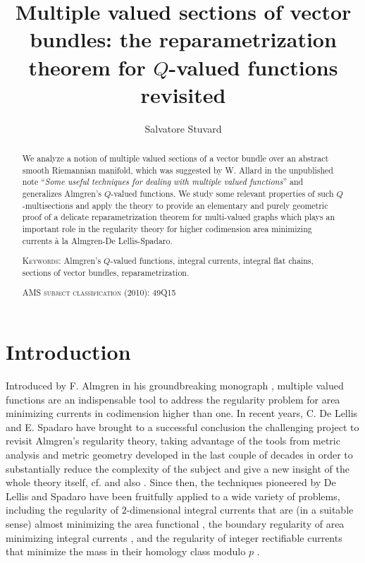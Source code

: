 \documentclass[a4paper,11pt,reqno]{amsart}
\title[Multiple valued sections of vector bundles]{Multiple valued sections of vector bundles: the reparametrization theorem for $Q$-valued functions revisited}
\author{Salvatore Stuvard}
\theoremstyle{definition}
\numberwithin{equation}{section}
\numberwithin{subsection}{section}
\begin{document}
\begin{abstract}
We analyze a notion of multiple valued sections of a vector bundle over an abstract smooth Riemannian manifold, which was suggested by W. Allard in the unpublished note ``\textit{Some useful techniques for dealing with multiple valued functions}'' and generalizes Almgren's $Q$-valued functions. We study some relevant properties of such $Q$-multisections and apply the theory to provide an elementary and purely geometric proof of a delicate reparametrization theorem for multi-valued graphs which plays an important role in the regularity theory for higher codimension area minimizing currents \`a la Almgren-De Lellis-Spadaro.


\vspace{4pt}
\noindent \textsc{Keywords:} Almgren's $Q$-valued functions, integral currents, integral flat chains, sections of vector bundles, reparametrization.

\vspace{4pt}
\noindent \textsc{AMS subject classification (2010):} 49Q15

\end{abstract}

\maketitle

\section{Introduction}

Introduced by F. Almgren in his groundbreaking monograph \cite{Almgren00}, multiple valued functions are an indispensable tool to address the regularity problem for area minimizing currents in codimension higher than one. In recent years, C. De Lellis and E. Spadaro have brought to a successful conclusion the challenging project to revisit Almgren's regularity theory, taking advantage of the tools from metric analysis and metric geometry developed in the last couple of decades in order to substantially reduce the complexity of the subject and give a new insight of the whole theory itself, cf. \cite{DLS11a, DLS13a, DLS14, DLS13b, DLS13c} and also \cite{DeLellis2015}. Since then, the techniques pioneered by De Lellis and Spadaro have been fruitfully applied to a wide variety of problems, including the regularity of $2$-dimensional integral currents that are (in a suitable sense) almost minimizing the area functional \cite{DLSS1,DLSS2,DLSS3}, the boundary regularity of area minimizing integral currents \cite{DLDPHM}, and the regularity of integer rectifiable currents that minimize the mass in their homology class modulo $p$ \cite{DLHMS_linear, DLHMS}. 
\end{document}

